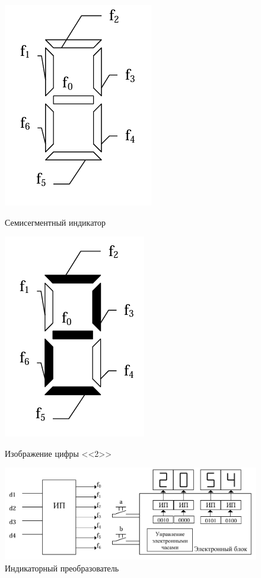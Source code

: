 \documentclass[10pt,a4paper,final]{article} %
\begin{document}
\begin{figure}[htpb]
	\centering
	\begin{minipage}{0.45\textwidth}
		\centering
		\includegraphics[scale=0.6]{img/indicator.png}
		\caption{Семисегментный индикатор}
		\label{indicator}
	\end{minipage}
	\hfill
	\begin{minipage}{0.45\textwidth}
		\centering
		\includegraphics[scale=0.6]{img/digit2.png}
		\caption{Изображение цифры <<2>>}
		\label{digit2}
	\end{minipage}
	\hfill
	\begin{minipage}{0.9\textwidth}
		\centering
		\includegraphics[scale=0.6]{img/IC.png}
		\caption{Индикаторный преобразователь}
		\label{IC}
	\end{minipage} 
\end{figure}
\end{document}
